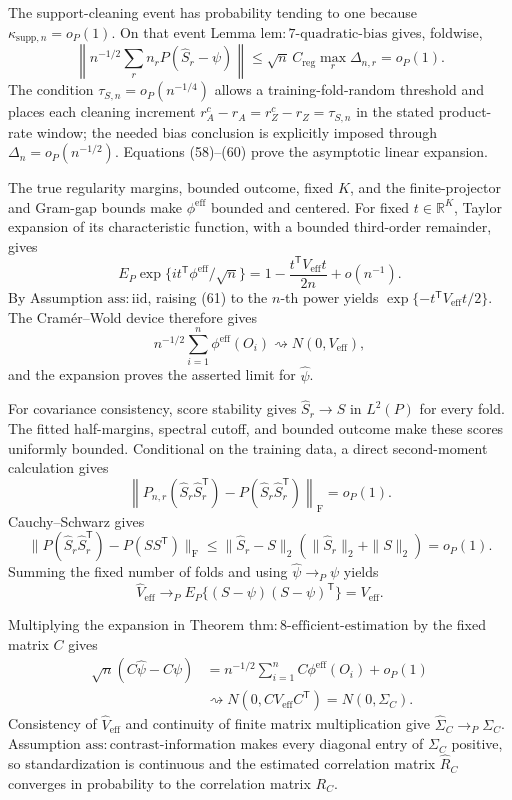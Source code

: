 The support-cleaning event has probability tending to one because
\(\kappa_{\mathrm{supp},n}=o_P(1)\).  On that event Lemma \(\mathrm{lem{:}7\mbox{-}quadratic\mbox{-}bias}\) gives, foldwise,
\[
 \left\|n^{-1/2}\sum_rn_rP(\widehat S_r-\psi)\right\|
 \leq\sqrt n\,C_{\mathrm{reg}}\max_r\Delta_{n,r}=o_P(1). \tag{60}
\]
The condition \(\tau_{S,n}=o_P(n^{-1/4})\) allows a training-fold-random threshold and places each cleaning increment
\(r_A^c-r_A=r_Z^c-r_Z=\tau_{S,n}\) in the stated product-rate window; the needed bias conclusion is explicitly imposed through
\(\Delta_n=o_P(n^{-1/2})\).  Equations (58)--(60) prove the asymptotic linear expansion.

The true regularity margins, bounded outcome, fixed \(K\), and the finite-projector and Gram-gap bounds make \(\phi^{\mathrm{eff}}\) bounded and centered.  For fixed \(t\in\mathbb R^K\), Taylor expansion of its characteristic function, with a bounded third-order remainder, gives
\[
 E_P\exp\{it^{\mathsf T}\phi^{\mathrm{eff}}/\sqrt n\}
 =1-\frac{t^{\mathsf T}V_{\mathrm{eff}}t}{2n}+o(n^{-1}). \tag{61}
\]
By Assumption \(\mathrm{ass{:}iid}\), raising (61) to the \(n\)-th power yields
\(\exp\{-t^{\mathsf T}V_{\mathrm{eff}}t/2\}\).  The Cramér--Wold device therefore gives
\[
n^{-1/2}\sum_{i=1}^n\phi^{\mathrm{eff}}(O_i)
\rightsquigarrow N(0,V_{\mathrm{eff}}),
\]
and the expansion proves the asserted limit for \(\widehat\psi\).

For covariance consistency, score stability gives \(\widehat S_r\to S\) in \(L^2(P)\) for every fold.  The fitted half-margins, spectral cutoff, and bounded outcome make these scores uniformly bounded.  Conditional on the training data, a direct second-moment calculation gives
\[
 \left\|P_{n,r}(\widehat S_r\widehat S_r^{\mathsf T})
 -P(\widehat S_r\widehat S_r^{\mathsf T})\right\|_{\mathrm F}=o_P(1). \tag{62}
\]
Cauchy--Schwarz gives
\[
 \|P(\widehat S_r\widehat S_r^{\mathsf T})-P(SS^{\mathsf T})\|_{\mathrm F}
 \leq\|\widehat S_r-S\|_2(\|\widehat S_r\|_2+\|S\|_2)=o_P(1). \tag{63}
\]
Summing the fixed number of folds and using \(\widehat\psi\to_P\psi\) yields
\[
 \widehat V_{\mathrm{eff}}
 \to_P E_P\{(S-\psi)(S-\psi)^{\mathsf T}\}=V_{\mathrm{eff}}.
\]

Multiplying the expansion in Theorem \(\mathrm{thm{:}8\mbox{-}efficient\mbox{-}estimation}\) by the fixed matrix \(C\) gives
\[
\begin{aligned}
 \sqrt n(C\widehat\psi-C\psi)
 &=n^{-1/2}\sum_{i=1}^nC\phi^{\mathrm{eff}}(O_i)+o_P(1)\\
 &\rightsquigarrow N(0,CV_{\mathrm{eff}}C^{\mathsf T})
 =N(0,\Sigma_C). \tag{64}
\end{aligned}
\]
Consistency of \(\widehat V_{\mathrm{eff}}\) and continuity of finite matrix multiplication give
\(\widehat\Sigma_C\to_P\Sigma_C\).  Assumption \(\mathrm{ass{:}contrast\mbox{-}information}\) makes every diagonal entry of \(\Sigma_C\) positive, so standardization is continuous and the estimated correlation matrix \(\widehat R_C\) converges in probability to the correlation matrix \(R_C\).

